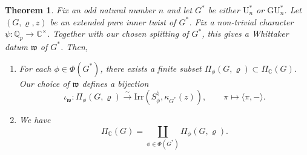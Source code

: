 \documentclass[reqno,11pt]{amsart}
\newtheorem{theorem}{Theorem}[section]
\theoremstyle{remark}
\newcommand{\GU}{\mathrm{GU}}
\newcommand{\U}{\mathrm{U}}
\newcommand{\C}{\mathbb{C}}
\newcommand{\Irr}{\mathrm{Irr}}
\newcommand{\mf}{\mathfrak}
\newcommand{\Q}{\mathbb{Q}}
\begin{document}
\begin{theorem}{\label{thm: fullLLC}}
Fix an odd natural number $n$ and let $G^*$ be either $\U^*_n$ or $\GU^*_n$. Let $(G, \varrho, z)$ be an extended pure inner twist of $G^*$. Fix a non-trivial character $\psi: \Q_p \to \C^{\times}$. Together with our chosen splitting of $G^*$, this gives a Whittaker datum $\mf{w}$ of $G^*$. Then,
\begin{enumerate}
    \item For each $\phi \in \Phi(G^*)$, there exists a finite subset $\Pi_{\phi}(G, \varrho) \subset \Pi_{\C}(G)$. Our choice of $\mf{w}$ defines a bijection
\[
\iota_{\mf{w}}: \Pi_{\phi} (G, \varrho) \xrightarrow{\sim} \Irr (S^{\natural}_{\phi}, \kappa_{G^*}(z)), \qquad \pi \mapsto \langle \pi, - \rangle.
\]
 

\item We have
\begin{equation*}
    \Pi_{\C}(G) = \coprod_{\phi \in \Phi(G^*)} \Pi_{\phi} (G, \varrho).
\end{equation*}
\end{enumerate}
\end{theorem}
\end{document}
